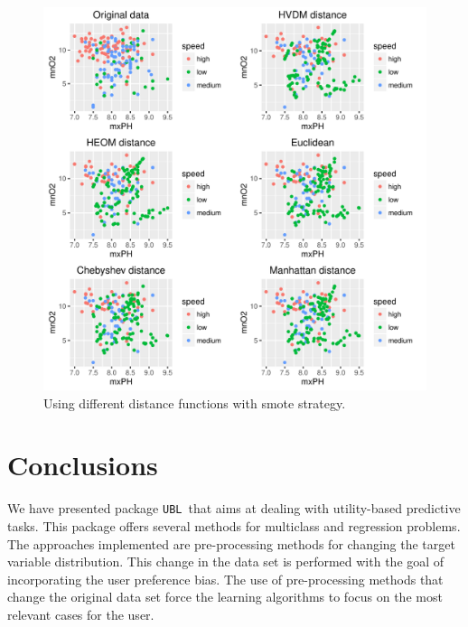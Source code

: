 \documentclass[10pt,a4paper]{article}\usepackage[]{graphicx}\usepackage[]{color}
\makeatletter
\def\maxwidth{ %
  \ifdim\Gin@nat@width>\linewidth
    \linewidth
  \else
    \Gin@nat@width
  \fi
}
\newenvironment{knitrout}{}{} %
\newcommand{\pUBL}{package \texttt{UBL}\ }
\makeatother
\begin{document}
\begin{knitrout}\footnotesize
{}\color{fgcolor}\begin{figure}

{\centering \includegraphics[width=\maxwidth]{figures/UBL-dist_HVDM2-1} 

}

\caption[Using different distance functions with  smote strategy]{Using different distance functions with  smote strategy.}\label{fig:dist_HVDM2}
\end{figure}


\end{knitrout}



\section{Conclusions}\label{sec:conc}

We have presented \pUBL that aims at dealing with utility-based predictive tasks. This package offers several methods for multiclass and regression problems. The approaches implemented are pre-processing methods for changing the target variable distribution. This change in the data set is performed with the goal of incorporating the user preference bias. The use of pre-processing methods that change the original data set force the learning algorithms to focus on the most relevant cases for the user.
\end{document}
